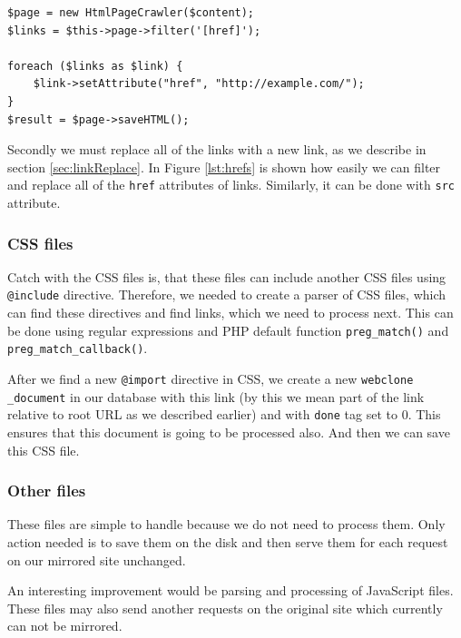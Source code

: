 \begin{lstlisting}[caption={Example of finding and replacing href attributes in an HTML document},label={lst:hrefs}]
$page = new HtmlPageCrawler($content);
$links = $this->page->filter('[href]');

foreach ($links as $link) {
	$link->setAttribute("href", "http://example.com/");
}
$result = $page->saveHTML();
\end{lstlisting}

Secondly we must replace all of the links with a new link, as we describe in section \ref{sec:linkReplace}. In Figure \ref{lst:hrefs} is shown how easily we can filter and replace all of the \texttt{href} attributes of links. Similarly, it can be done with \texttt{src} attribute.

\subsubsection{CSS files}
Catch with the CSS files is, that these files can include another CSS files using \texttt{@include} directive. Therefore, we needed to create a parser of CSS files, which can find these directives and find links, which we need to process next. This can be done using regular expressions and PHP default function \texttt{preg\_match()} and \texttt{preg\_match\_callback()}.

After we find a new \texttt{@import} directive in CSS, we create a new \texttt{webclone \_document} in our database with this link (by this we mean part of the link relative to root URL as we described earlier) and with \texttt{done} tag set to 0. This ensures that this document is going to be processed also. And then we can save this CSS file.

\subsubsection{Other files}
These files are simple to handle because we do not need to process them. Only action needed is to save them on the disk and then serve them for each request on our mirrored site unchanged.

An interesting improvement would be parsing and processing of JavaScript files. These files may also send another requests on the original site which currently can not be mirrored.


